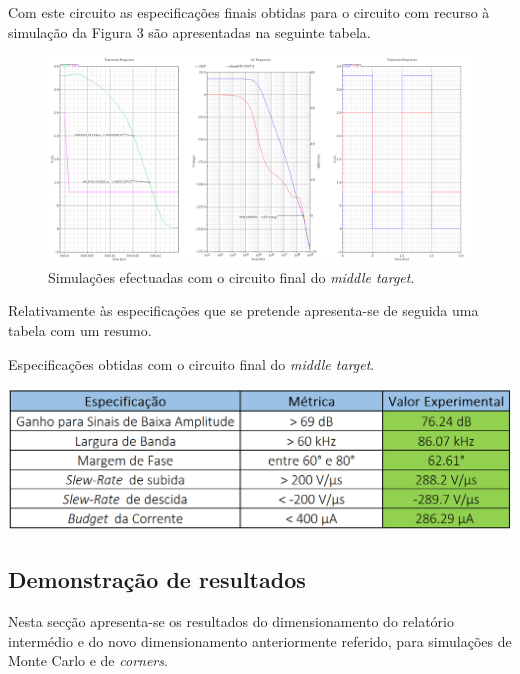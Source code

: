 \documentclass[11pt]{article}
\numberwithin{equation}{section}
\begin{document}
Com este circuito as especificações finais obtidas para o circuito com recurso à simulação da Figura 3 são apresentadas na seguinte tabela.

\begin{figure}[H]
	\centering
	\includegraphics[keepaspectratio=true, scale=0.25]{exps/SIngle_Run}
	\vspace{-0.5em}
	\caption{Simulações efectuadas com o circuito final do \textit{middle target}.} 
	\vspace{-0.8em}
\end{figure} 

Relativamente às especificações que se pretende apresenta-se de seguida uma tabela com um resumo.

\begin{table}[H]
	\centering
	\caption{Especificações obtidas com o circuito final do \textit{middle target}.}
	\vspace{-1.5mm}
	\includegraphics[keepaspectratio=true, scale=0.35]{teoricas/specsfinal}
\end{table}

\subsection{Demonstração de resultados} 

Nesta secção apresenta-se os resultados do dimensionamento do relatório intermédio e do novo dimensionamento anteriormente referido, para simulações de Monte Carlo e de \textit{corners}.
\end{document}
